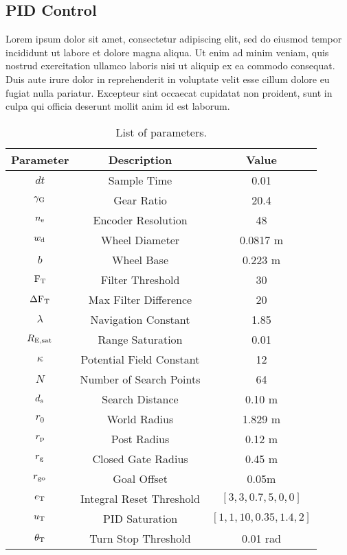 \documentclass[conference]{IEEEtran}
\begin{document}
\subsection{PID Control}
Lorem ipsum dolor sit amet, consectetur adipiscing elit, sed do eiusmod tempor incididunt ut labore et dolore magna aliqua. Ut enim ad minim veniam, quis nostrud exercitation ullamco laboris nisi ut aliquip ex ea commodo consequat. Duis aute irure dolor in reprehenderit in voluptate velit esse cillum dolore eu fugiat nulla pariatur. Excepteur sint occaecat cupidatat non proident, sunt in culpa qui officia deserunt mollit anim id est laborum.
    

\begin{table}[h]
\caption{List of parameters.}
\label{tab:params}
\begin{center}
\begin{tabular}{|c| c| c|}
\hline
Parameter &Description    	 &Value \\
\hline
    $dt$ &Sample Time &0.01\\
    $\gamma_{\rm G}$ &Gear Ratio &20.4 \\
    $n_{\rm e}$    &Encoder Resolution &48 \\
    $w_{\rm d}$ &Wheel Diameter &0.0817 m\\
    $b$ &Wheel Base &0.223 m\\
    ${\rm F}_{\rm T}$ &Filter Threshold &30\\
    $\Delta {\rm F}_{\rm T}$ &Max Filter Difference &20\\
    $\lambda$    &Navigation Constant   &1.85    \\
    $R_{{\rm E}, \rm{sat}}$ &Range Saturation &0.01 \\
    $\kappa$    &Potential Field Constant   &12 \\
    $N$ &Number of Search Points &64\\
    $d_{\rm s}$ &Search Distance &0.10 m\\
    $r_0$ &World Radius &1.829 m\\
    $r_{\rm p}$ &Post Radius &0.12 m\\
    $r_{\rm g}$ &Closed Gate Radius &0.45 m\\
    $r_{{\rm g} {\rm o}}$ &Goal Offset &0.05m \\
    $e_{\rm T}$ &Integral Reset Threshold & $[3,3,0.7,5,0,0]$ \\
    $u_{\rm T}$ &PID Saturation & $[1,1,10,0.35,1.4,2]$ \\
    $\theta_{\rm T}$ &Turn Stop Threshold &0.01 rad\\

\end{tabular}
\end{center}
\end{table}
\end{document}

